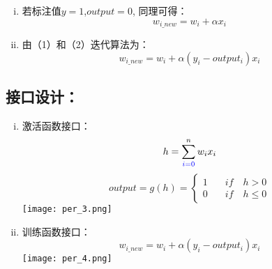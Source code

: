 \documentclass{article}
\begin{document}
\begin{CJK*}{UTF8}{gbsn}
\begin{enumerate}[(i)]
\item 若标注值$y=1$,$output=0$, 同理可得：
\begin{equation}
w_{i\_new}=w_{i} + \alpha x_{i} 
\end{equation}

\item 由（1）和（2）迭代算法为：
$$w_{i\_new}=w_{i} + \alpha \left(y_{i}-output_{i}\right) x_{i} $$ 
\end{enumerate}


\subsection{接口设计：}

\begin{enumerate}[(i)]
\item 激活函数接口：
$$
h = \sum_{\textcolor{blue}{ i=0} }^{n}w_{i}x_{i}
$$
$$
output = g\left(h\right) = \left\{
\begin{aligned}
1\quad  & if \quad h > 0 \\
0 \quad & if \quad h \leqslant 0
\end{aligned}
\right.
$$
\texttt{[image: per\_3.png]}


\item 训练函数接口：
$$ w_{i\_new}=w_{i} + \alpha \left(y_{i}-output_{i}\right) x_{i} $$
\texttt{[image: per\_4.png]}
\end{enumerate}

\end{CJK*}
\end{document}
